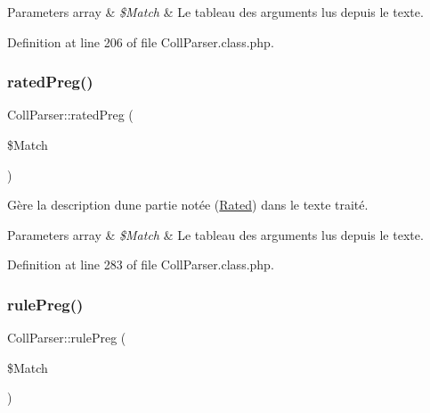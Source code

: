 \begin{DoxyParams}[1]{Parameters}
array & {\em \$\+Match} & Le tableau des arguments lus depuis le texte. \\
\hline
\end{DoxyParams}


Definition at line 206 of file Coll\+Parser.\+class.\+php.

\mbox{\label{class_coll_parser_a3d6b54a92a85ffb379de62914687aa65}} 
\subsubsection{\texorpdfstring{rated\+Preg()}{ratedPreg()}}
{\footnotesize\ttfamily Coll\+Parser\+::rated\+Preg (\begin{DoxyParamCaption}\item[{}]{\$\+Match }\end{DoxyParamCaption})\hspace{0.3cm}{\ttfamily [protected]}}

Gère la description d\textquotesingle{}une partie notée (\hyperlink{class_rated}{Rated}) dans le texte traité.


\begin{DoxyParams}[1]{Parameters}
array & {\em \$\+Match} & Le tableau des arguments lus depuis le texte. \\
\hline
\end{DoxyParams}


Definition at line 283 of file Coll\+Parser.\+class.\+php.

\mbox{\label{class_coll_parser_a9712c0a4898503e75816eab8322b7f8b}} 
\subsubsection{\texorpdfstring{rule\+Preg()}{rulePreg()}}
{\footnotesize\ttfamily Coll\+Parser\+::rule\+Preg (\begin{DoxyParamCaption}\item[{}]{\$\+Match }\end{DoxyParamCaption})\hspace{0.3cm}{\ttfamily [protected]}}

